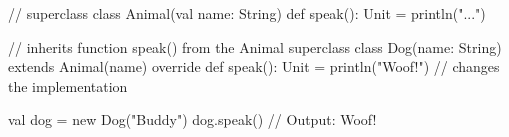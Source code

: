 // superclass
class Animal(val name: String) {
  def speak(): Unit = println("...")
}

// inherits function speak() from the Animal superclass
class Dog(name: String) extends Animal(name) {
  override def speak(): Unit = println("Woof!") // changes the implementation
}

val dog = new Dog("Buddy")
dog.speak() // Output: Woof!